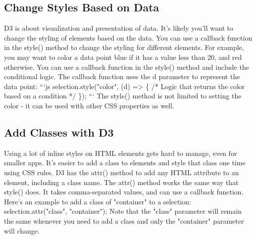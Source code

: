 \documentclass{article}%
\begin{document}
\subsection{Change Styles Based on Data}%
\label{subsec:ChangeStylesBasedonData}%
D3 is about visualization and presentation of data. It's likely you'll want to change the styling of elements based on the data. You can use a callback function in the style() method to change the styling for different elements.\newline%
For example, you may want to color a data point blue if it has a value less than 20, and red otherwise. You can use a callback function in the style() method and include the conditional logic. The callback function uses the d parameter to represent the data point:\newline%
```js\newline%
selection.style("color", (d) => \{\newline%
  /* Logic that returns the color based on a condition */\newline%
\});\newline%
```\newline%
The style() method is not limited to setting the color {-} it can be used with other CSS properties as well.\newline%

%
\subsection{Add Classes with D3}%
\label{subsec:AddClasseswithD3}%
Using a lot of inline styles on HTML elements gets hard to manage, even for smaller apps. It's easier to add a class to elements and style that class one time using CSS rules. D3 has the attr() method to add any HTML attribute to an element, including a class name.\newline%
The attr() method works the same way that style() does. It takes comma{-}separated values, and can use a callback function. Here's an example to add a class of "container" to a selection:\newline%
selection.attr("class", "container");\newline%
Note that the "class" parameter will remain the same whenever you need to add a class and only the "container" parameter will change.\newline%

%
\end{document}
